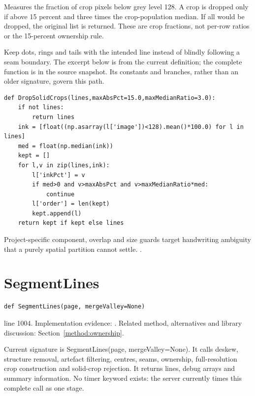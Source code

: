 Measures the fraction of crop pixels below grey level 128. A crop is dropped only if above 15 percent and three times the crop-population median. If all would be dropped, the original list is returned. These are crop fractions, not per-row ratios or the 15-percent ownership rule.


Keep dots, rings and tails with the intended line instead of blindly following a seam boundary. The excerpt below is from the current definition; the complete function is in the source snapshot. Its constants and branches, rather than an older signature, govern this path.


\begin{lstlisting}[style=plain]
def DropSolidCrops(lines,maxAbsPct=15.0,maxMedianRatio=3.0):
    if not lines:
        return lines
    ink = [float((np.asarray(l['image'])<128).mean()*100.0) for l in lines]
    med = float(np.median(ink))
    kept = []
    for l,v in zip(lines,ink):
        l['inkPct'] = v
        if med>0 and v>maxAbsPct and v>maxMedianRatio*med:
            continue
        l['order'] = len(kept)
        kept.append(l)
    return kept if kept else lines
\end{lstlisting}
Project-specific component, overlap and size guards target handwriting ambiguity that a purely spatial partition cannot settle. \cite{code2026,opencvshape}.


\section{SegmentLines}\label{fn:segment:SegmentLines}
\begin{lstlisting}[style=sig]
def SegmentLines(page, mergeValley=None)
\end{lstlisting}
 line 1004. Implementation evidence: \cite{code2026}. Related method, alternatives and library discussion: Section~\ref{method:ownership}.


Current signature is SegmentLines(page, mergeValley=None). It calls deskew, structure removal, artefact filtering, centres, seams, ownership, full-resolution crop construction and solid-crop rejection. It returns lines, debug arrays and summary information. No timer keyword exists: the server currently times this complete call as one stage.


